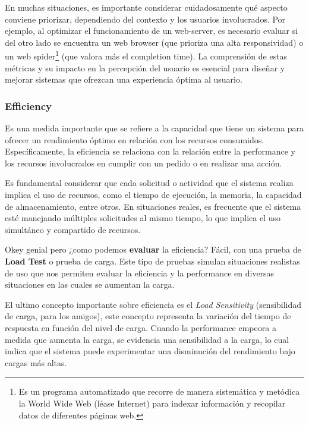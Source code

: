 \documentclass{article}
\begin{document}
 		En muchas situaciones, es importante considerar cuidadosamente qué aspecto conviene priorizar, dependiendo del contexto y los usuarios involucrados. Por ejemplo, al optimizar el funcionamiento de un web-server, es necesario evaluar si del otro lado se encuentra un web browser (que prioriza una alta responsividad) o un web spider\footnote{Es un programa automatizado que recorre de manera sistemática y metódica la World Wide Web (léase Internet) para indexar información y recopilar datos de diferentes páginas web.} (que valora más el completion time). La comprensión de estas métricas y su impacto en la percepción del usuario es esencial para diseñar y mejorar sistemas que ofrezcan una experiencia óptima al usuario.

 		
		\subsubsection{Efficiency}
		
		Es una medida importante que se refiere a la capacidad que tiene un sistema para ofrecer un rendimiento óptimo en relación con los recursos consumidos. Específicamente, la eficiencia se relaciona con la relación entre la performance y los recursos involucrados en cumplir con un pedido o en realizar una acción.
		
		Es fundamental considerar que cada solicitud o actividad que el sistema realiza implica el uso de recursos, como el tiempo de ejecución, la memoria, la capacidad de almacenamiento, entre otros. En situaciones reales, es frecuente que el sistema esté manejando múltiples solicitudes al mismo tiempo, lo que implica el uso simultáneo y compartido de recursos.
		
		Okey genial pero ¿como podemos \textbf{evaluar} la eficiencia? Fácil, con una prueba de \textbf{Load Test} o prueba de carga. Este tipo de pruebas simulan situaciones realistas de uso que nos permiten evaluar la eficiencia y la performance en diversas situaciones	en las cuales se aumentan la carga.
		
		El ultimo concepto importante sobre eficiencia es el \textit{Load Sensitivity} (\small{sensibilidad de carga, para los amigos}), este concepto representa la variación del tiempo de respuesta en función del nivel de carga. Cuando la performance empeora a medida que aumenta la carga, se evidencia una sensibilidad a la carga, lo cual indica que el sistema puede experimentar una disminución del rendimiento bajo cargas más altas.
		
		
		
\end{document}
